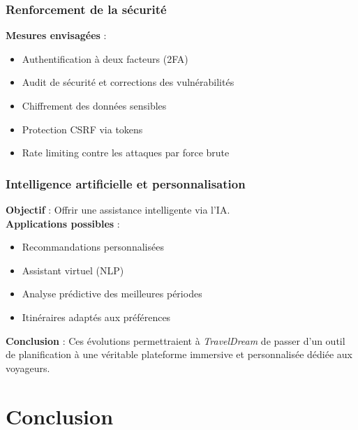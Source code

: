 \documentclass[a4paper,12pt]{article}
\begin{document}
\subsubsection{Renforcement de la sécurité}
\textbf{Mesures envisagées} :
\begin{itemize}
  \item Authentification à deux facteurs (2FA)
  \item Audit de sécurité et corrections des vulnérabilités
  \item Chiffrement des données sensibles
  \item Protection CSRF via tokens
  \item Rate limiting contre les attaques par force brute
\end{itemize}

\subsubsection{Intelligence artificielle et personnalisation}
\textbf{Objectif} : Offrir une assistance intelligente via l'IA.\\
\textbf{Applications possibles} :
\begin{itemize}
  \item Recommandations personnalisées
  \item Assistant virtuel (NLP)
  \item Analyse prédictive des meilleures périodes
  \item Itinéraires adaptés aux préférences
\end{itemize}


\textbf{Conclusion} : Ces évolutions permettraient à \textit{TravelDream} de passer d’un outil de planification à une véritable plateforme immersive et personnalisée dédiée aux voyageurs.
\section{Conclusion}
\end{document}
